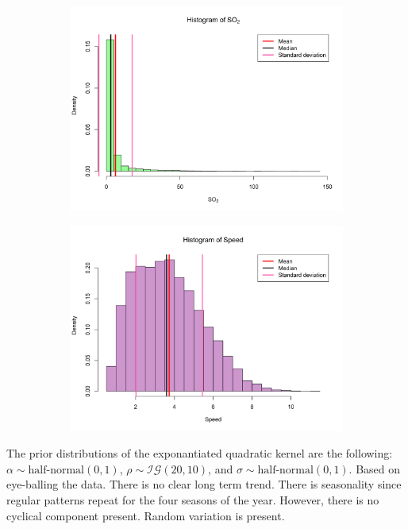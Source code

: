 \documentclass[a4paper, 10pt]{article}
\begin{document}
\begin{flushleft}
\begin{figure}[H]
         \begin{subfigure}[t]{0.48\linewidth}
            \centering
            \includegraphics[width=\linewidth]{../images/so2_hist_2019.png}
         \end{subfigure}
         \hfill
         \begin{subfigure}[t]{0.48\linewidth}
            \centering
            \includegraphics[width=\linewidth]{../images/speed_hist_2019.png}
         \end{subfigure}
      \end{figure}

      The prior distributions of the exponantiated quadratic kernel are the following: $\alpha \sim \text{half-normal}(0, 1)$, $\rho \sim \mathcal{IG}(20, 10)$, and $\sigma \sim \text{half-normal}(0, 1)$. Based on eye-balling the data. There is no clear long term trend. There is seasonality since regular patterns repeat for the four seasons of the year. However, there is no cyclical component present. Random variation is present.


\end{flushleft}
\end{document}
